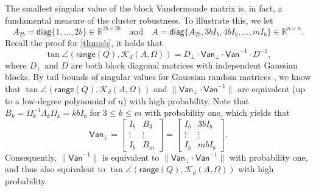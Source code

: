 \documentclass{article}
\newcommand{\van}{\mathsf{Van}}
\newcommand{\R}{\mathbb{R}}
\newcommand{\range}{\mathsf{range}}
\providecommand{\diagm}{\mathsf{diag}}
\providecommand{\norm}[1]{\lVert#1\rVert}
\begin{document}
The smallest singular value of the block Vandermonde matrix is, in fact, a fundamental measure of the cluster robustness. To illustrate this, we let
\begin{equation*}
    A_{2b} = \diagm\{1,\dotsc,2b\}\in\R^{2b\times 2b}
    \quad\text{and}\quad 
    A = \diagm\{A_{2b},3bI_{b},4bI_{b},\dotsc,mI_{b}\}\in\R^{n\times n}.
\end{equation*}
Recall the proof for \cref{thm:sb}, it holds that  
\begin{equation*}
    \tan\angle(\range(Q),\mathcal{K}_{d}(A,\Omega)) = D_{\perp}\cdot \van_{\perp}\cdot \van^{-1}\cdot D^{-1},
\end{equation*}
where $D_{\perp}$ and $D$ are both block diagonal matrices with independent Gaussian blocks. By tail bounds of singular values for Gaussian random matrices \cite{Rudelson2010}, we know that $\tan\angle(\range(Q),\mathcal{K}_{d}(A,\Omega))$ and $\norm{\van_{\perp}\cdot\van^{-1}}$ are equivalent (up to a low-degree polynomial of $n$) with high probability. Note that $B_{k}=\Omega_{k}^{-1}\Lambda_{k}\Omega_{k}=kbI_{b}$ for $3\leq k\leq m$ with probability one, which yields that 
\begin{equation*}
    \van_{\perp} = 
    \begin{bmatrix}
        I_{b} & B_{3}\\ 
        \vdots & \vdots\\ 
        I_{b} & B_{m}
    \end{bmatrix}
    =  \begin{bmatrix}
        I_{b} & 3bI_{b} \\ 
        \vdots & \vdots \\ 
        I_{b} & mbI_{b}
    \end{bmatrix}.
\end{equation*}
Consequently, $\norm{\van^{-1}}$ is equivalent to $\norm{\van_{\perp}\cdot\van^{-1}}$ with probability one, and thus also equivalent to $\tan\angle(\range(Q),\mathcal{K}_{d}(A,\Omega))$ with high probability. 
\end{document}
